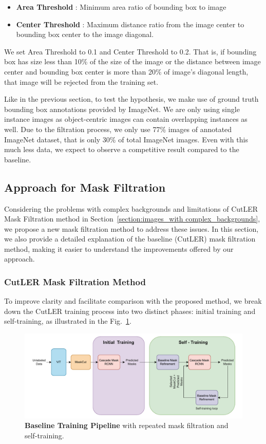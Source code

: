 \begin{itemize}
	\item \textbf{Area Threshold} : Minimum area ratio of bounding box to image
	\item \textbf{Center Threshold} : Maximum distance ratio from the image center to bounding box center to the image diagonal.
\end{itemize}

We set Area Threshold to 0.1 and Center Threshold to 0.2. That is, if bounding box has size less than 10\% of the size of the image or the distance between image center and bounding box center is more than 20\% of image's diagonal length, that image will be rejected from the training set.

Like in the previous section, to test the hypothesis, we make use of ground truth bounding box annotations provided by ImageNet. We are only using single instance images as object-centric images can contain overlapping instances as well. Due to the filtration process, we only use 77\% images of annotated ImageNet dataset, that is only 30\% of total ImageNet images. Even with this much less data, we expect to observe a competitive result compared to the baseline. 


\subsection{Approach for Mask Filtration}
\label{section:Mask-Filtration}
Considering the problems with complex backgrounds and limitations of CutLER Mask Filtration method in Section~\ref{section:images_with complex_backgrounds}, we propose a new mask filtration method to address these issues. In this section, we also provide a detailed explanation of the baseline (CutLER) mask filtration method, making it easier to understand the improvements offered by our approach.

\subsubsection{CutLER Mask Filtration Method}
\label{sec:baseline_mask_filteration}
To improve clarity and facilitate comparison with the proposed method, we break down the CutLER training process into two distinct phases: initial training and self-training, as illustrated in the Fig.~\ref{fig:baseline_training}.

\begin{figure}
	\centering
	\includegraphics[width=1\textwidth]{Images/main/baseline_approach.pdf}
	\caption[\textbf{Baseline Training Pipeline}]{\textbf{Baseline Training Pipeline} with repeated mask filtration and self-training.}
	\label{fig:baseline_training}
\end{figure}

